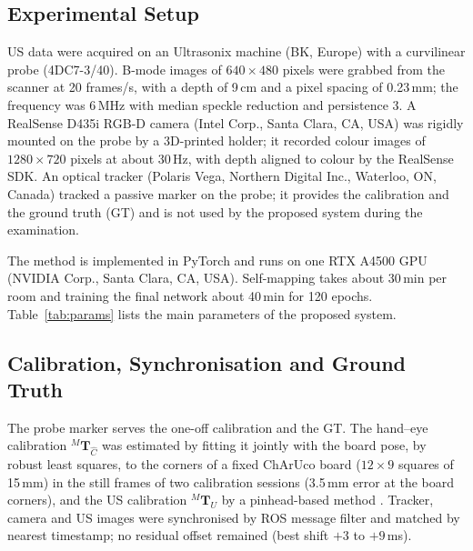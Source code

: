 \documentclass[9pt,shortpaper,twoside,web]{ieeecolor2}
\newcommand{\Tf}[2]{{}^{#1}\mathbf{T}_{#2}}
\newcommand{\Ch}{\hat{C}}%
\begin{document}
\subsection{Experimental Setup}
\label{sec:implementation}
US data were acquired on an Ultrasonix machine (BK, Europe) with a curvilinear probe (4DC7-3/40). B-mode images of $640\times480$ pixels were grabbed from the scanner at 20 frames/s, with a depth of 9\,cm and a pixel spacing of 0.23\,mm; the frequency was 6\,MHz with median speckle reduction and persistence 3. A RealSense D435i RGB-D camera (Intel Corp., Santa Clara, CA, USA) was rigidly mounted on the probe by a 3D-printed holder; it recorded colour images of $1280\times720$ pixels at about 30\,Hz, with depth aligned to colour by the RealSense SDK. An optical tracker (Polaris Vega, Northern Digital Inc., Waterloo, ON, Canada) tracked a passive marker on the probe; it provides the calibration and the ground truth (GT) and is not used by the proposed system during the examination.

The method is implemented in PyTorch and runs on one RTX A4500 GPU (NVIDIA Corp., Santa Clara, CA, USA). Self-mapping takes about 30\,min per room and training the final network about 40\,min for 120 epochs. Table~\ref{tab:params} lists the main parameters of the proposed system.

\subsection{Calibration, Synchronisation and Ground Truth}
\label{sec:calib}\label{sec:groundtruth}\label{sec:sensorcal}
The probe marker serves the one-off calibration and the GT. The hand--eye calibration $\Tf{M}{\Ch}$ was estimated by fitting it jointly with the board pose, by robust least squares, to the corners of a fixed ChArUco board ($12\times9$ squares of 15\,mm) in the still frames of two calibration sessions (3.5\,mm error at the board corners), and the US calibration $\Tf{M}{U}$ by a pinhead-based method \cite{TODO-us-calibration}. Tracker, camera and US images were synchronised by ROS message filter and matched by nearest timestamp; no residual offset remained (best shift $+3$ to $+9$\,ms).
\end{document}
